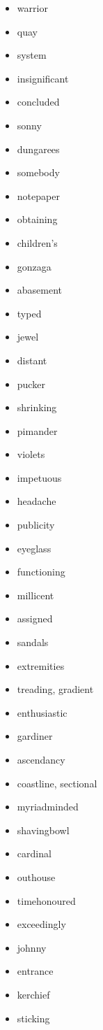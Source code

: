 \documentclass{article}
\begin{document}
\begin{itemize}
    \item warrior
    \item quay
    \item system
    \item insignificant
    \item concluded
    \item sonny
    \item dungarees
    \item somebody
    \item notepaper
    \item obtaining
    \item children's
    \item gonzaga
    \item abasement
    \item typed
    \item jewel
    \item distant
    \item pucker
    \item shrinking
    \item pimander
    \item violets
    \item impetuous
    \item headache
    \item publicity
    \item eyeglass
    \item functioning
    \item millicent
    \item assigned
    \item sandals
    \item extremities
    \item treading, gradient
    \item enthusiastic
    \item gardiner
    \item ascendancy
    \item coastline, sectional
    \item myriadminded
    \item shavingbowl
    \item cardinal
    \item outhouse
    \item timehonoured
    \item exceedingly
    \item johnny
    \item entrance
    \item kerchief
    \item sticking

\end{itemize}
\end{document}

